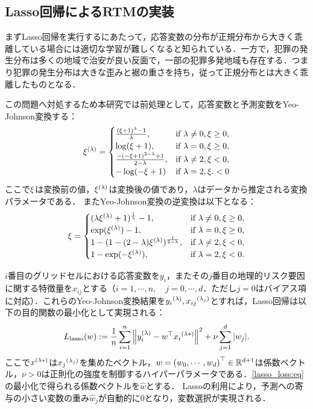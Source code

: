 \subsection{Lasso回帰によるRTMの実装}
まずLasso回帰を実行するにあたって，応答変数の分布が正規分布から大きく乖離している場合には適切な学習が難しくなると知られている\cite{islp, esl}．一方で，犯罪の発生分布は多くの地域で治安が良い反面で，一部の犯罪多発地域も存在する．つまり犯罪の発生分布は大きな歪みと裾の重さを持ち，従って正規分布とは大きく乖離したものとなる．
%

この問題へ対処するため本研究では前処理として，応答変数と予測変数をYeo-Johnson変換\cite{yeo}する：
\begin{equation*}\label{yeo:eq}
  {\xi}^{(\lambda)} =
   \begin{cases} 
   \frac{(\xi+1)^\lambda - 1}{\lambda}, & \text{if } \lambda \neq 0, \xi \geq 0,  \\ 
   \log(\xi+1), & \text{if } \lambda = 0, \xi \geq 0,   \\ 
   \frac{-(-\xi+1)^{2-\lambda} + 1}{2-\lambda}, & \text{if } \lambda \neq 2, \xi < 0,  \\ 
   -\log(-\xi+1) & \text{if } \lambda = 2, \xi. < 0
   \end{cases}
\end{equation*}
ここで$\xi$は変換前の値，${\xi}^{(\lambda)}$は変換後の値であり，$\lambda$はデータから推定される変換パラメータである．
またYeo-Johnson変換の逆変換は以下となる：
\begin{equation*}\label{yeo_inv:eq}
  \xi =
  \begin{cases} 
    (\lambda{\xi}^{(\lambda)}+1)^{\frac{1}{\lambda}}-1, & \text{if } \lambda \neq 0, \xi \geq 0,  \\ 
  \exp({\xi}^{(\lambda)})-1, & \text{if } \lambda = 0, \xi \geq 0,   \\ 
  1-(1-(2-\lambda){\xi}^{(\lambda)})^{\frac{1}{2-\lambda}}, & \text{if } \lambda \neq 2, \xi < 0,  \\ 
  1-\exp(-{\xi}^{(\lambda)}), & \text{if } \lambda = 2,  \xi < 0.
  \end{cases}
\end{equation*}

$i$番目のグリッドセルにおける応答変数を$y_i$，またその$j$番目の地理的リスク要因に関する特徴量を$x_{ij}$とする（$i=1,\cdots, n,\quad j=0,\cdots, d$．ただし$j=0$はバイアス項に対応）．これらのYeo-Johnson変換結果を${y_i}^{(\lambda)}, {x_{ij}}^{(\lambda_j)}$とすれば，Lasso回帰は以下の目的関数の最小化として実現される\cite{Lasso}：
\begin{align} \label{lasso_loss:eq}
  L_\mathrm{lasso}(w) := \frac{1}{n}\sum_{i=1}^n\left\|
    {y}^{(\lambda)}_i-{w}^\top{{x_i}^{(\lambda*)}}
    \right\|^2 + \nu\sum_{j=1}^{d}|w_j|. 
\end{align}
ここで${x}^{(\lambda*)}$は${x_j}^{(\lambda_j)}$を集めたベクトル，$w={(w_0, \cdots, w_d)}^\top\in\mathbb{R}^{d+1}$は係数ベクトル，$\nu>0$は正則化の強度を制御するハイパーパラメータである．\cref{lasso_loss:eq}の最小化で得られる係数ベクトルを$\hat w$とする．
Lassoの利用により，予測への寄与の小さい変数の重み$\hat w_j$が自動的に$0$となり，変数選択が実現される\cite{Lasso, islp, esl}．

